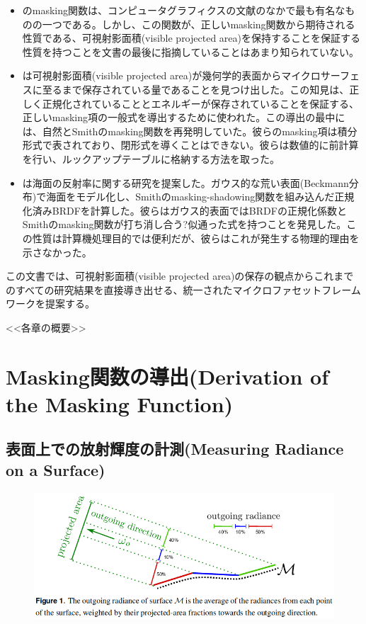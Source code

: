 \documentclass[a4j,xelatex,ja=standard]{bxjsarticle}
\begin{document}
\begin{itemize}
\item \citeauthor{Smith1967} \cite{Smith1967}のmasking関数は、コンピュータグラフィクスの文献のなかで最も有名なものの一つである。しかし、この関数が、正しいmasking関数から期待される性質である、可視射影面積(visible projected area)を保持することを保証する性質を持つことを文書の最後に指摘していることはあまり知られていない。

\item \citeauthor{Ashikmin2000} \cite{Ashikmin2000}は可視射影面積(visible projected area)が幾何学的表面からマイクロサーフェスに至るまで保存されている量であることを見つけ出した。この知見は、正しく正規化されていることとエネルギーが保存されていることを保証する、正しいmasking項の一般式を導出するために使われた。この導出の最中には、自然とSmithのmasking関数を再発明していた。彼らのmasking項は積分形式で表されており、閉形式を導くことはできない。彼らは数値的に前計算を行い、ルックアップテーブルに格納する方法を取った。

\item \citeauthor{Ross2005} \cite{Ross2005}は海面の反射率に関する研究を提案した。ガウス的な荒い表面(Beckmann分布)で海面をモデル化し、Smithのmasking-shadowing関数を組み込んだ正規化済みBRDFを計算した。彼らはガウス的表面ではBRDFの正規化係数とSmithのmasking関数が打ち消し合う?似通った式を持つことを発見した。この性質は計算機処理目的では便利だが、彼らはこれが発生する物理的理由を示さなかった。
\end{itemize}

この文書では、可視射影面積(visible projected area)の保存の観点からこれまでのすべての研究結果を直接導き出せる、統一されたマイクロファセットフレームワークを提案する。

<<各章の概要>>

\section{Masking関数の導出(Derivation of the Masking Function)}
\label{sec:2}

\subsection{表面上での放射輝度の計測(Measuring Radiance on a Surface)}
\label{sec:2.1}

\begin{figure}
    \includegraphics[width=\textwidth]{Figure1.png}
    \caption{}
    \label{fig:1}
\end{figure}
\end{document}
